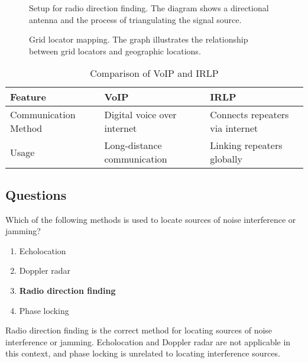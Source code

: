 \begin{figure}[h]
    \centering
    \caption{Setup for radio direction finding. The diagram shows a directional antenna and the process of triangulating the signal source.}
    \label{fig:direction_finding}
\end{figure}

\begin{figure}[h]
    \centering
    \caption{Grid locator mapping. The graph illustrates the relationship between grid locators and geographic locations.}
    \label{fig:grid_locator}
\end{figure}

\begin{table}[h]
    \centering
    \begin{tabular}{|l|l|l|}
        \hline
        \textbf{Feature} & \textbf{VoIP} & \textbf{IRLP} \\
        \hline
        Communication Method & Digital voice over internet & Connects repeaters via internet \\
        \hline
        Usage & Long-distance communication & Linking repeaters globally \\
        \hline
    \end{tabular}
    \caption{Comparison of VoIP and IRLP}
    \label{tab:voip_irlp}
\end{table}

\subsection*{Questions}
\begin{tcolorbox}[colback=gray!10!white,colframe=black!75!black,title={T8C01}]
    Which of the following methods is used to locate sources of noise interference or jamming?
    \begin{enumerate}[label=\Alph*),noitemsep]
        \item Echolocation
        \item Doppler radar
        \item \textbf{Radio direction finding}
        \item Phase locking
    \end{enumerate}
\end{tcolorbox}
Radio direction finding is the correct method for locating sources of noise interference or jamming. Echolocation and Doppler radar are not applicable in this context, and phase locking is unrelated to locating interference sources.

